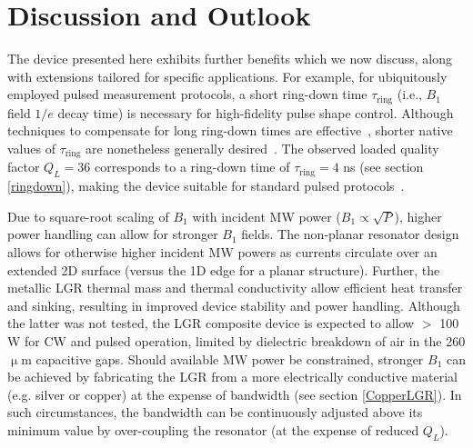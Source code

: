 
\chapter{Discussion and Outlook} \label{ch4}

The device presented here exhibits further benefits which we now discuss, along with extensions tailored for specific applications. For example, for ubiquitously employed pulsed measurement protocols, a short ring-down time $\tau_\text{ring}$ (i.e., $B_1$ field $1/e$ decay time) is necessary for high-fidelity pulse shape control. Although techniques to compensate for long ring-down times are effective~\cite{tabuchi2010total,borneman2012bandwidth,peshkovsky2005rf}, shorter native values of $\tau_\text{ring}$ are nonetheless generally desired~\cite{pfenninger1995general,rinard2005loopgap}. The observed loaded quality factor $Q_L = 36$ corresponds to a ring-down time of $\tau_\text{ring} = 4$ ns (see section \ref{ringdown}), making the device suitable for standard pulsed protocols~\cite{Smeltzer2009Quantum, Jelezko2004Observation}. 


Due to square-root scaling of $B_1$ with incident MW power ($B_1 \propto \sqrt{P}$), higher power handling can allow for stronger $B_1$ fields. The non-planar resonator design allows for otherwise higher incident MW powers as currents circulate over an extended 2D surface (versus the 1D edge for a planar structure). Further, the metallic LGR thermal mass and  thermal conductivity allow efficient heat transfer and sinking, resulting in improved device stability and power handling. Although the latter was not tested, the LGR composite device is expected to allow $>\!$ 100 W for CW and pulsed operation, limited by dielectric breakdown of air in the 260 $\upmu$m capacitive gaps. Should available MW power be constrained, stronger $B_1$ can be achieved by fabricating the LGR from a more electrically conductive material (e.g. silver or copper) at the expense of bandwidth (see section \ref{CopperLGR}). In such circumstances, the bandwidth can be continuously adjusted above its minimum value by over-coupling the resonator (at the expense of reduced $Q_L$). 

